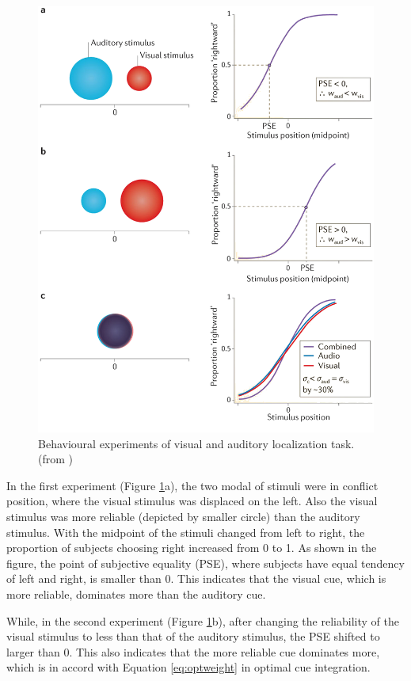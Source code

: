 \documentclass[12pt,twoside]{article}
\theoremstyle{plain}
\theoremstyle{definition}
\theoremstyle{remark}
\begin{document}
\begin{figure}[htpb]
  \centering
  \includegraphics[width=.9\textwidth]{fetsch-visaudloc}
  \caption{Behavioural experiments of visual and auditory localization task. (from \cite{fetsch_bridging_2013})}
  \label{fig:visaudloc}
\end{figure}

In the first experiment (Figure \ref{fig:visaudloc}a), the two modal of stimuli were in conflict position, where the visual stimulus was displaced on the left. Also the visual stimulus was more reliable (depicted by smaller circle) than the auditory stimulus. With the midpoint of the stimuli changed from left to right, the proportion of subjects choosing right increased from 0 to 1. As shown in the figure, the point of subjective equality (PSE), where subjects have equal tendency of left and right, is smaller than 0. This indicates that the visual cue, which is more reliable, dominates more than the auditory cue.

While, in the second experiment (Figure \ref{fig:visaudloc}b), after changing the reliability of the visual stimulus to less than that of the auditory stimulus, the PSE shifted to larger than 0. This also indicates that the more reliable cue dominates more, which is in accord with Equation \ref{eq:optweight} in optimal cue integration.
\end{document}
